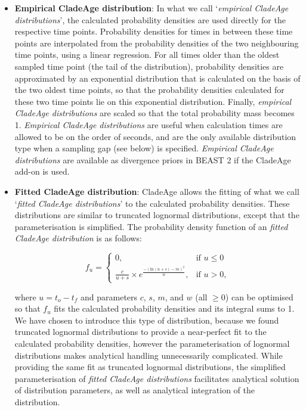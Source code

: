 \documentclass{article}
\begin{document}
\begin{itemize}
\item
{\bf Empirical CladeAge distribution}: In what we call `\emph{empirical CladeAge distributions}', the calculated probability densities are used directly for the respective time points. Probability densities for times in between these time points are interpolated from the probability densities of the two neighbouring time points, using a linear regression. For all times older than the oldest sampled time point (the tail of the distribution), probability densities are approximated by an exponential distribution that is calculated on the basis of the two oldest time points, so that the probability densities calculated for these two time points lie on this exponential distribution. Finally, \emph{empirical CladeAge distributions} are scaled so that the total probability mass becomes 1. \emph{Empirical CladeAge distributions} are useful when calculation times are allowed to be on the order of seconds, and are the only available distribution type when a sampling gap (see below) is specified. \emph{Empirical CladeAge distributions} are available as divergence priors in BEAST 2 if the CladeAge add-on is used.

\item
{\bf Fitted CladeAge distribution}: CladeAge allows the fitting of what we call `\emph{fitted CladeAge distributions}' to the calculated probability densities. These distributions are similar to truncated lognormal distributions, except that the parameterisation is simplified. The probability density function of an \emph{fitted CladeAge distribution} is as follows:

\begin{equation*}
f_{u} =
\begin{cases}
0, & \mbox{if } u \leq 0 \\
\frac{c}{u + s} \times e^{\frac{-(\mathrm{ln}(u+s) - m)^2}{w}}, & \mbox{if } u > 0,
\end{cases}
\end{equation*}

where $u = t_o - t_f$ and parameters $c$, $s$, $m$, and $w$ (all $\geq 0$) can be optimised so that $f_{u}$ fits the calculated probability densities and its integral sums to 1. We have chosen to introduce this type of distribution, because we found truncated lognormal distributions to provide a near-perfect fit to the calculated probability densities, however the parameterisation of lognormal distributions makes analytical handling unnecessarily complicated. While providing the same fit as truncated lognormal distributions, the simplified parameterisation of \emph{fitted CladeAge distributions} facilitates analytical solution of distribution parameters, as well as analytical integration of the distribution.


\end{itemize}
\end{document}
